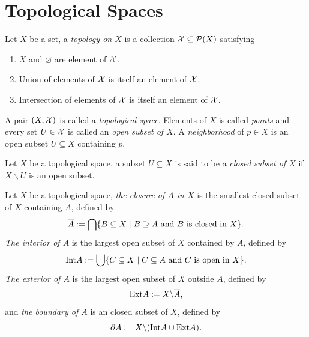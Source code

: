 \section{Topological Spaces}
\begin{definition}
    Let $X$ be a set, a \textit{topology on $X$} is a collection $\mathcal{X} \subseteq \mathcal{P}(X)$ satisfying
    \begin{enumerate}
        \item $X$ and $\varnothing$ are element of $\mathcal{X}$.
        \item Union of elements of $\mathcal{X}$ is itself an element of $\mathcal{X}$.
        \item Intersection of elements of $\mathcal{X}$ is itself an element of $\mathcal{X}$.
    \end{enumerate}
    A pair $(X,\mathcal{X})$ is called a \textit{topological space}. Elements of $X$ is called \textit{points} and every set $U \in \mathcal{X}$ is called an \textit{open subset of $X$}. A \textit{neighborhood} of $p \in X$ is an open subset $U \subseteq X$ containing $p$.
\end{definition}
\begin{definition}
    Let $X$ be a topological space, a subset $U \subseteq X$ is said to be a \textit{closed subset of $X$} if $X \backslash U$ is an open subset.
\end{definition}
\begin{definition}
    Let $X$ be a topological space, \textit{the closure of $A$ in $X$} is the smallest closed subset of $X$ containing $A$, defined by
    \[
        \overline{A} := \bigcap\{B \subseteq X\mid B \supseteq A \text{ and $B$ is closed in $X$}\}.
    \]
    \textit{The interior of $A$} is the largest open subset of $X$ contained by $A$, defined by 
    \[
        \mathrm{Int}{A} := \bigcup\{C \subseteq X \mid C \subseteq A \text{ and $C$ is open in $X$}\}.
    \]
    \textit{The exterior of $A$} is the largest open subset of $X$ outside $A$, defined by 
    \[
        \mathrm{Ext}{A} := X \backslash \overline{A},
    \]
    and \textit{the boundary of $A$} is an closed subset of $X$, defined by 
    \[
        \partial A := X \backslash (\mathrm{Int} A \cup \mathrm{Ext} A).
    \]


\end{definition}
